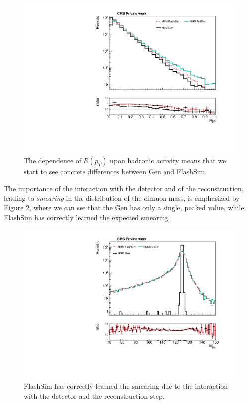 \begin{figure}
    \centering
    \includegraphics[width=\linewidth]{gfx/ch6/gen_vs_flash_Rpt___PreSel_log.pdf}
    \caption[Gen vs FlashSim for $R(p_T)$]{The dependence of $R(p_T)$ upon hadronic activity means that we start to see concrete differences between Gen and FlashSim.}
    \label{fig:rptgen}
   \end{figure}
   
The importance of the interaction with the detector and of the reconstruction, leading to \emph{smearing} in the distribution of the dimuon mass, is emphasized by Figure \ref{fig:higggen}, where we can see that the Gen has only a single, peaked value, while FlashSim has correctly learned the expected smearing.

\begin{figure}
    \centering
    \includegraphics[width=\linewidth]{gfx/ch6/gen_vs_flash_Higgs_m___PreSel_log.pdf}
    \caption[Gen vs FlashSim for $M_{\mu\mu}$]{FlashSim has correctly learned the smearing due to the interaction with the detector and the reconstruction step.}
    \label{fig:higggen}
   \end{figure}
   
